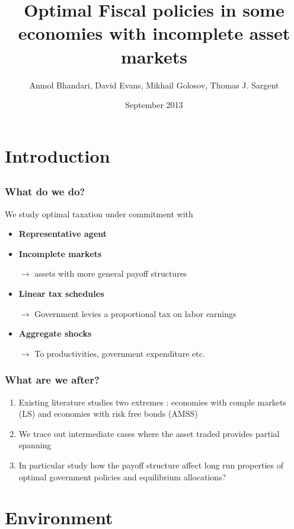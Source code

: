 \documentclass{beamer}
\title { Optimal Fiscal
policies in some economies with incomplete asset markets}
\author{Anmol Bhandari, David Evans, Mikhail Golosov, Thomas J. Sargent}
\date{September 2013}
\begin{document}
%
\begin{frame}
\titlepage

\end{frame}
\section{Introduction}
\subsection{}
\begin{frame}
\frametitle{What do we do?}
We study optimal taxation under commitment with
\begin{itemize}
 \item \textbf{Representative agent}

 \item \textbf{Incomplete markets}

 \quad \color{red}$\rightarrow$ \color{black} assets with more general payoff structures

 \item \textbf{Linear tax schedules}

 \quad \color{red}$\rightarrow$ \color{black}Government levies a proportional tax on labor earnings 

 \item \textbf{Aggregate shocks}

 \quad \color{red}$\rightarrow$ \color{black} To productivities, government expenditure etc.

 \end{itemize}
\end{frame}


\begin{frame}
\frametitle{What are we after?}

\begin{enumerate}
\item Existing literature studies two extremes : economies with comple markets (LS) and economies with risk free bonds (AMSS)
\item We trace out intermediate cases where the asset traded provides partial spanning
 \item In particular study how the payoff structure affect long run properties of optimal government policies and equilibrium allocations?
\end{enumerate}

\end{frame}


\section{Environment}
\end{document}
